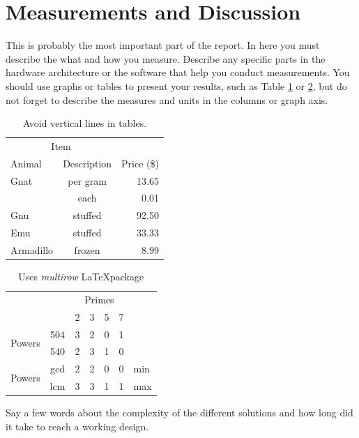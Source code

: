 \documentclass[11pt]{article}
\begin{document}
\section{Measurements and Discussion}
This is probably the most important part of the report. In here you must describe the what and how you measure. Describe any specific parts in the hardware architecture or the software that help you conduct measurements. You should use graphs or tables to present your results, such as Table \ref{tab:example} or \ref{tab:example2}, but do not forget to describe the measures and units in the columns or graph axis.

\begin{table}[htbp]
   \centering
   \begin{tabular}{@{} lcr @{}} %
      \toprule
      \multicolumn{2}{c}{Item} \\
      \cmidrule(r){1-2} %
      Animal    & Description & Price (\$)\\
      \midrule
      Gnat      & per gram & 13.65 \\
                & each     &  0.01 \\
      Gnu       & stuffed  & 92.50 \\
      Emu       & stuffed  & 33.33 \\
      Armadillo & frozen   &  8.99 \\
      \bottomrule
   \end{tabular}
   \caption{Avoid vertical lines in tables.}
   \label{tab:example}
\end{table}

\begin{table}[htbp]
   \centering 
 \begin{tabular}{cc|c|c|c|c|l}
\cline{3-6}
& & \multicolumn{4}{|c|}{Primes} \\ \cline{3-6}
& & 2 & 3 & 5 & 7 \\ \cline{1-6}
\multicolumn{1}{|c|}{\multirow{2}{*}{Powers}} &
\multicolumn{1}{|c|}{504} & 3 & 2 & 0 & 1 &     \\ \cline{2-6}
\multicolumn{1}{|c|}{}                        &
\multicolumn{1}{|c|}{540} & 2 & 3 & 1 & 0 &     \\ \cline{1-6}
\multicolumn{1}{|c|}{\multirow{2}{*}{Powers}} &
\multicolumn{1}{|c|}{gcd} & 2 & 2 & 0 & 0 & min \\ \cline{2-6}
\multicolumn{1}{|c|}{}                        &
\multicolumn{1}{|c|}{lcm} & 3 & 3 & 1 & 1 & max \\ \cline{1-6}
\end{tabular}
  \caption{Uses \textit{multirow} \LaTeX package}
   \label{tab:example2}
\end{table}
Say a few words about the complexity of the different solutions and how long did it take to reach a working design.
 
\end{document}
